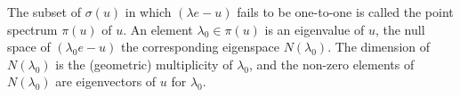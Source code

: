 The subset of $\sigma(u)$ in which $(\lambda e - u)$ fails to be one-to-one is called the point spectrum $\pi(u)$ of $u$. An element $\lambda_0 \in \pi(u)$ is an eigenvalue of $u$, the null space of $(\lambda_0 e - u)$ the corresponding eigenspace $N(\lambda_0)$. The dimension of $N(\lambda_0)$ is the (geometric) multiplicity of $\lambda_0$, and the non-zero elements of $N(\lambda_0)$ are eigenvectors of $u$ for $\lambda_0$.
